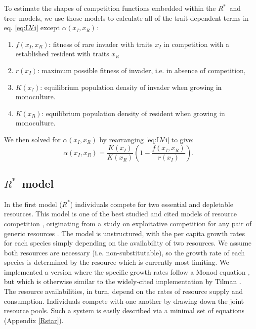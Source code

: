\documentclass[a4paper,11pt]{article}
\newcommand{\Rstar}{\ensuremath{R^*}}
\newcommand{\TREE}{{\sc tree}}
\begin{document}
To estimate the shapes of competition functions embedded within the \Rstar\
and \TREE\ models, we use those models to calculate all of the trait-dependent
terms in eq. \ref{eq:LVi} except $\alpha(x_I, x_R)$:
\begin{enumerate}
  \item $f(x_I, x_R)$: fitness of rare invader with traits $x_I$  in competition
  with a established resident with traits $x_R$
  \item $r(x_I)$: maximum possible fitness of invader, i.e. in absence of competition,
  \item $K(x_I)$: equilibrium population density of invader when growing in monoculture.
  \item $K(x_R)$: equilibrium population density of resident when growing in
  monoculture.
\end{enumerate}
We then solved for $\alpha(x_I, x_R)$ by rearranging  \ref{eq:LVi} to give:
\begin{equation}
  \label{eq:alpha}
 \alpha(x_I, x_R) = \frac{K(x_I)}{K(x_R)}
  \left(1 - \frac{f(x_I, x_R)}{r(x_I)}\right).
\end{equation}

\subsection{\Rstar\ model}


In the first model (\Rstar) individuals compete for two essential and
depletable resources. This model is one of the best studied and cited models
of resource competition \citep{Tilman-1977, Tilman-1982, Huisman-1999},
originating from a study on exploitative competition for any pair of generic
resources \citep{Leon-1975}. The model is unstructured, with the per capita
growth rates for each species simply depending on the availability of two
resources. We assume both resources are necessary (i.e. non-substitutable), so
the growth rate of each species is determined by the resource which is
currently most limiting. We implemented a version where the specific growth
rates follow a Monod equation \citet{Huisman-1999}, but which is otherwise
similar to the widely-cited implementation by Tilman \citep{Tilman-1977,
Tilman-1982}.  The resource availabilities, in turn, depend on the rates of
resource supply and consumption. Individuals compete with one another by
drawing down the joint resource pools. Such a system is easily described via a
minimal set of equations (Appendix \ref{Rstar}).
\end{document}
